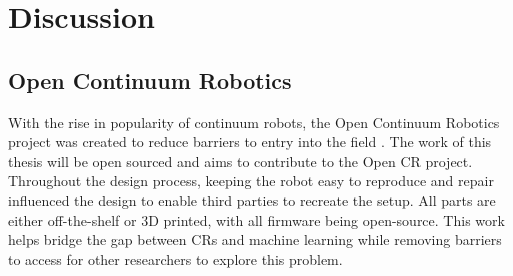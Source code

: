 \pagebreak
\section{Discussion}
\label{sec:discussion}






\subsection{Open Continuum Robotics}
With the rise in popularity of continuum robots, the Open Continuum Robotics project was created to reduce barriers to entry into the field \cite{open_cr}. The work of this thesis will be open sourced and aims to contribute to the Open CR project. Throughout the design process, keeping the robot easy to reproduce and repair influenced the design to enable third parties to recreate the setup. All parts are either off-the-shelf or 3D printed, with all firmware being open-source. This work helps bridge the gap between CRs and machine learning while removing barriers to access for other researchers to explore this problem. 

